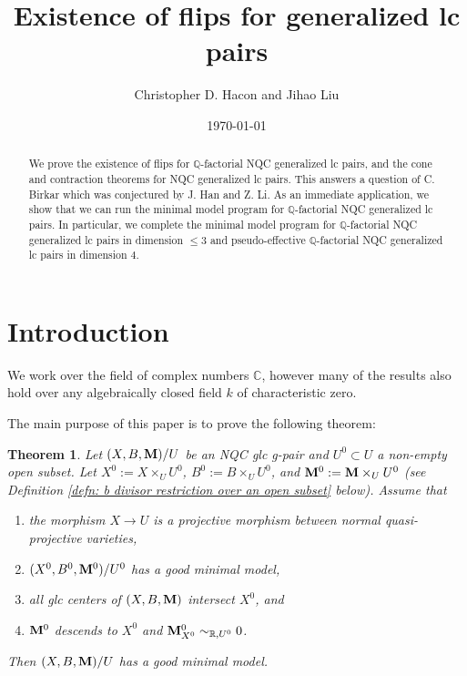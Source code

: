 \documentclass[11pt]{amsart}
\numberwithin{equation}{section}
\newcommand{\Mm}{{\bf{M}}}
\newcommand{\Qq}{\mathbb{Q}}
\newtheorem{thm}{Theorem}[section]
\theoremstyle{definition}
\theoremstyle{definition}
\theoremstyle{definition}
\begin{document}
\title{Existence of flips for generalized lc pairs}
\author{Christopher D. Hacon and Jihao Liu}


\address{Department of Mathematics, The University of Utah, Salt Lake City, UT 84112, USA}


\address{Department of Mathematics, The University of Utah, Salt Lake City, UT 84112, USA}

\date{\today}



\begin{abstract}
We prove the existence of flips for $\Qq$-factorial NQC generalized lc pairs, and the cone and contraction theorems for NQC generalized lc pairs. This answers a question of C. Birkar which was conjectured by J. Han and Z. Li. As an immediate application, we show that we can run the minimal model program for $\Qq$-factorial NQC generalized lc pairs. In particular, we complete the minimal model program for $\Qq$-factorial NQC generalized lc pairs in dimension $\leq 3$ and pseudo-effective $\Qq$-factorial NQC generalized lc pairs in dimension $4$.
\end{abstract}

\maketitle

\tableofcontents







\section{Introduction}

We work over the field of complex numbers $\mathbb C$, however many of the results also hold over any algebraically closed field $k$ of characteristic zero.

The main purpose of this paper is to prove the following theorem:

\begin{thm}\label{thm: existence of glc closure}
Let $(X,B,\Mm)/U$ be an NQC glc g-pair and $U^0\subset U$ a non-empty open subset. Let  $X^0:=X\times_UU^0$, $B^0:=B\times_UU^0$, and $\Mm^0:=\Mm\times_UU^0$ (see Definition \ref{defn: b divisor restriction over an open subset} below). Assume that
\begin{enumerate}
\item the morphism $X\rightarrow U$ is a projective morphism between normal quasi-projective varieties,
\item $(X^0,B^0,\Mm^0)/U^0$ has a good minimal model,
\item all glc centers of $(X,B,\Mm)$ intersect $X^0$, and
\item $\Mm ^0$ descends to $X^0$ and $\Mm^0_{X^0}\sim_{\mathbb R,U^0}0$.
\end{enumerate}
Then $(X,B,\Mm)/U$ has a good minimal model.
\end{thm}
\end{document}
